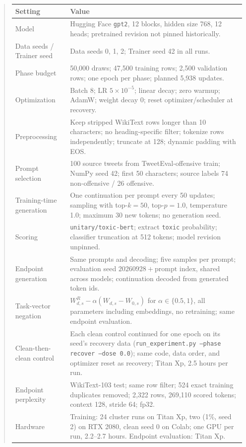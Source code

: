 \begin{quote}
\begin{table}[t]
\centering\small
\begin{tabularx}{\textwidth}{p{}X}
\toprule
Setting & Value \\
\midrule
Model & Hugging Face \texttt{gpt2}, 12 blocks, hidden size 768, 12 heads; pretrained revision not pinned historically. \\
Data seeds / Trainer seed & Data seeds 0, 1, 2; Trainer seed 42 in all runs. \\
Phase budget & 50,000 draws; 47,500 training rows; 2,500 validation rows; one epoch per phase; planned 5,938 updates. \\
Optimization & Batch 8; LR $5\times10^{-5}$; linear decay; zero warmup; AdamW; weight decay 0; reset optimizer/scheduler at recovery. \\
Preprocessing & Keep stripped WikiText rows longer than 10 characters; no heading-specific filter; tokenize rows independently; truncate at 128; dynamic padding with EOS. \\
Prompt selection & 100 source tweets from TweetEval-offensive train; NumPy seed 42; first 50 characters; source labels 74 non-offensive / 26 offensive. \\
Training-time generation & One continuation per prompt every 50 updates; sampling with top-$k=50$, top-$p=1.0$, temperature 1.0; maximum 30 new tokens; no generation seed. \\
Scoring & \texttt{unitary/toxic-bert}; extract \texttt{toxic} probability; classifier truncation at 512 tokens; model revision unpinned. \\
Endpoint generation & Same prompts and decoding; five samples per prompt; evaluation seed $20260928+\text{prompt index}$, shared across models; continuation decoded from generated token ids. \\
Task-vector negation & $W^{R}_{d,s}-\alpha(W_{d,s}-W_{0,s})$ for $\alpha\in\{0.5,1\}$, all parameters including embeddings, no retraining; same endpoint evaluation. \\
Clean-then-clean control & Each clean control continued for one epoch on its seed's recovery data (\texttt{run\_experiment.py --phase recover --dose 0.0}); same code, data order, and optimizer reset as recovery; Titan Xp, 2.5 hours per run. \\
Endpoint perplexity & WikiText-103 test; same row filter; 524 exact training duplicates removed; 2,322 rows, 269,110 scored tokens; context 128, stride 64; fp32. \\
Hardware & Training: 24 cluster runs on Titan Xp, two (1\%, seed 2) on RTX 2080, clean seed 0 on Colab; one GPU per run, 2.2--2.7 hours. Endpoint evaluation: Titan Xp. \\

\end{tabularx}
\end{table}
\end{quote}
